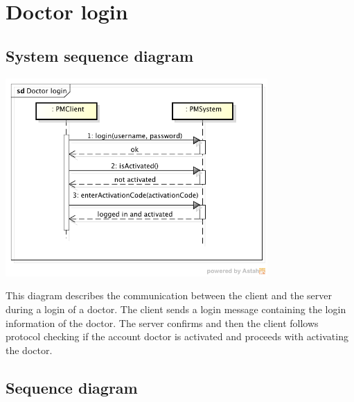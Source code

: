 \documentclass[fontsize=12pt,
               paper=a4,
               twoside=false,
               parskip=half,
               ]{scrartcl}
\begin{document}
\newcommand{\doctitle}{Design Model}


\tableofcontents



\section{Doctor login}

\subsection{System sequence diagram}

\includegraphics[width=10cm]{./img/system-sequence-diagrams/doctor-login.png}

This diagram describes the communication between the client and the server during a login of a doctor. The client sends a login message containing the login information of the doctor. The server confirms and then the client follows protocol checking if the account doctor is activated and proceeds with activating the doctor.

\subsection{Sequence diagram}
\end{document}
